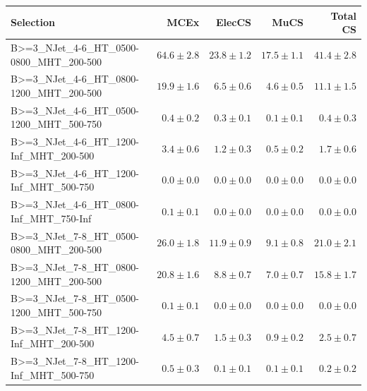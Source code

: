 \documentclass{beamer}
\begin{document}
\begin{frame}
\tiny
\begin{tabular}{lrrrr}
\toprule

                                                Selection  &          MCEx  &         ElecCS  &                     MuCS  &          Total CS  \\ 
\midrule
     B>=3\_NJet\_4-6\_HT\_0500-0800\_MHT\_200-500 &              $64.6\pm2.8$&             $23.8\pm1.2$&             $17.5\pm1.1$&                  $41.4\pm2.8$ \\ 
     B>=3\_NJet\_4-6\_HT\_0800-1200\_MHT\_200-500 &              $19.9\pm1.6$&              $6.5\pm0.6$&              $4.6\pm0.5$&                  $11.1\pm1.5$ \\ 
     B>=3\_NJet\_4-6\_HT\_0500-1200\_MHT\_500-750 &               $0.4\pm0.2$&              $0.3\pm0.1$&              $0.1\pm0.1$&                   $0.4\pm0.3$ \\ 
      B>=3\_NJet\_4-6\_HT\_1200-Inf\_MHT\_200-500 &               $3.4\pm0.6$&              $1.2\pm0.3$&              $0.5\pm0.2$&                   $1.7\pm0.6$ \\ 
      B>=3\_NJet\_4-6\_HT\_1200-Inf\_MHT\_500-750 &               $0.0\pm0.0$&              $0.0\pm0.0$&              $0.0\pm0.0$&                   $0.0\pm0.0$ \\ 
      B>=3\_NJet\_4-6\_HT\_0800-Inf\_MHT\_750-Inf &               $0.1\pm0.1$&              $0.0\pm0.0$&              $0.0\pm0.0$&                   $0.0\pm0.0$ \\ 
     B>=3\_NJet\_7-8\_HT\_0500-0800\_MHT\_200-500 &              $26.0\pm1.8$&             $11.9\pm0.9$&              $9.1\pm0.8$&                  $21.0\pm2.1$ \\ 
     B>=3\_NJet\_7-8\_HT\_0800-1200\_MHT\_200-500 &              $20.8\pm1.6$&              $8.8\pm0.7$&              $7.0\pm0.7$&                  $15.8\pm1.7$ \\ 
     B>=3\_NJet\_7-8\_HT\_0500-1200\_MHT\_500-750 &               $0.1\pm0.1$&              $0.0\pm0.0$&              $0.0\pm0.0$&                   $0.0\pm0.0$ \\ 
      B>=3\_NJet\_7-8\_HT\_1200-Inf\_MHT\_200-500 &               $4.5\pm0.7$&              $1.5\pm0.3$&              $0.9\pm0.2$&                   $2.5\pm0.7$ \\ 
      B>=3\_NJet\_7-8\_HT\_1200-Inf\_MHT\_500-750 &               $0.5\pm0.3$&              $0.1\pm0.1$&              $0.1\pm0.1$&                   $0.2\pm0.2$ \\ 

\end{tabular}
\end{frame}
\end{document}
